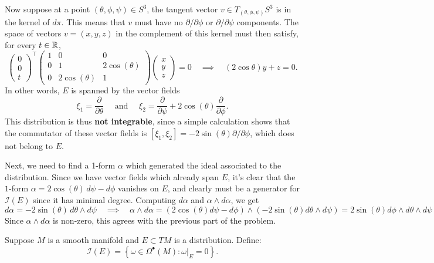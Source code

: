 \documentclass{../../templates/lkx_pset}
\begin{document}
\begin{parts}
  Now suppose at a point $(\theta,\phi,\psi)\in S^3$, the tangent vector $v\in T_{(\theta,\phi,\psi)} S^3$ is in the kernel of $d\pi$. This means that $v$ must have no $\partial/\partial \phi$ or $\partial /\partial \psi$ components. The space of vectors $v=(x,y,z)$ in the complement of this kernel must then satisfy, for every $t\in \mathbb{R}$,
  \[
    \begin{pmatrix}0 \\ 0 \\ t\end{pmatrix}^\intercal
		\begin{pmatrix} 1 & 0             & 0             \\
                0 & 1             & 2\cos(\theta) \\
                0 & 2\cos(\theta) & 1\end{pmatrix}\begin{pmatrix}x\\y\\z\end{pmatrix} = 0\quad\implies\quad (2\cos\theta) y + z = 0.
  \]
  In other words, $E$ is spanned by the vector fields
  \[
    \xi_1= \frac{\partial}{\partial \theta}
    \quad\textrm{ and }\quad
    \xi_2 = \frac{\partial}{\partial \psi} + 2\cos(\theta)\frac{\partial}{\partial \phi}.
  \]
  This distribution is thus \textbf{not integrable}, since a simple calculation shows that the commutator of these vector fields is $[\xi_1, \xi_2] = -2\sin(\theta)\partial / \partial \phi$, which does not belong to $E$. 

  Next, we need to find a 1-form $\alpha$ which generated the ideal associated to the distribution. Since we have vector fields which already span $E$, it's clear that the $1$-form $\alpha = 2\cos(\theta)\,d\psi - d\phi$ vanishes on $E$, and clearly must be a generator for $\mathcal{I}(E)$ since it has minimal degree. Computing $d\alpha$ and $\alpha\wedge d\alpha$, we get
  \[
    d\alpha = -2\sin(\theta)\,d\theta\wedge d\psi \quad\implies\quad \alpha\wedge d\alpha = (2\cos(\theta)d\psi - d\phi) \wedge (-2\sin(\theta) d\theta \wedge d\psi) = 2\sin(\theta)d\phi\wedge d\theta\wedge d\psi
  \]
  Since $\alpha\wedge d\alpha$ is non-zero, this agrees with the previous part of the problem.
\end{parts}

\begin{problem}{2}
Suppose $M$ is a smooth manifold and $E\subset TM$ is a distribution. Define:
\[
	\mathcal{I}(E) = \left\{ \omega \in \Omega^\bullet(M) : \omega|_E = 0\right\}.
\]
\end{problem}
\end{document}

